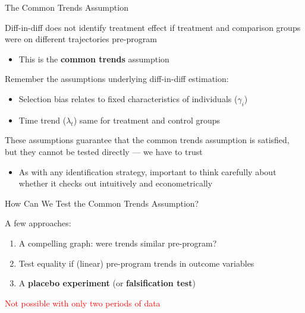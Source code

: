 \documentclass[10pt,xcolor=table,ignorenonframetext,handout,aspectratio=169]{beamer}
\newlength{\wideitemsep}
\let\olditem\item
\renewcommand{\item}{\setlength{\itemsep}{\wideitemsep}\olditem}
\begin{document}

\begin{frame}{The Common Trends Assumption}

\medskip
Diff-in-diff does not identify treatment effect if treatment and comparison groups were on different trajectories pre-program

\medskip
\begin{itemize}

\item
This is the \textbf{common trends} assumption

\smallskip

\end{itemize}

\pause
\medskip
Remember the assumptions underlying diff-in-diff estimation:

\medskip
\begin{itemize}

\item
Selection bias relates to fixed characteristics of individuals ($\gamma_i$)

\item
Time trend ($\lambda_t$) same for treatment and control groups

\end{itemize}

\pause
\medskip
These assumptions guarantee that the common trends assumption is satisfied, but they cannot be tested directly --- we have to trust

\medskip
\begin{itemize}

\item As with any identification strategy, important to think carefully about whether it checks out intuitively and econometrically

\end{itemize}

\end{frame}



\begin{frame}{How Can We Test the Common Trends Assumption?}

\medskip
A few approaches:  

\medskip
\begin{enumerate}

\item A compelling graph:  were trends similar pre-program?

\item Test equality if (linear) pre-program trends in outcome variables

\item A \textbf{placebo experiment} (or \textbf{falsification test})

\end{enumerate}

\pause
\medskip
\medskip
\textcolor{red}{Not possible with only two periods of data}

\end{frame}
\end{document}
